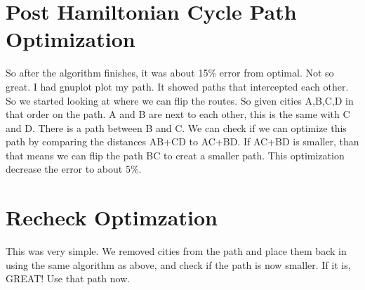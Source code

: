 \documentclass[letterpaper,10pt]{article}
\begin{document}
	\section{Post Hamiltonian Cycle Path Optimization}
		So after the algorithm finishes, it was about 15\% error from optimal.  Not so great.  I had gnuplot plot my path.  It showed paths that intercepted each other.  So we started looking at where we can flip the routes.  So given cities A,B,C,D in that order on the path. A and B are next to each other, this is the same with C and D.  There is a path between B and C.  We can check if we can optimize this path by comparing the distances AB+CD to AC+BD.  If AC+BD is smaller, than that means we can flip the path BC to creat a smaller path.  This optimization decrease the error to about 5\%.

	\section{Recheck Optimzation}
		This was very simple. We removed cities from the path and place them back in using the same algorithm as above, and check if the path is now smaller. If it is, GREAT! Use that path now. 
\end{document}
